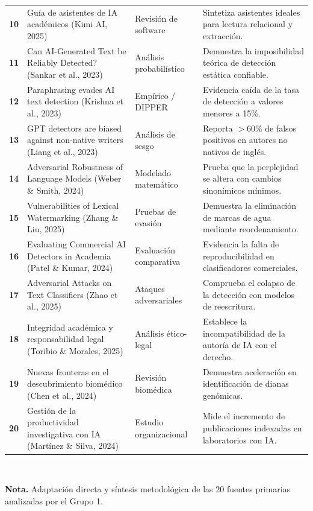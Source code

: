 \begin{table}[htpb!]
\begin{tabularx}{\textwidth}{>{\centering\arraybackslash\bfseries}p{0.6cm} >{\raggedright\arraybackslash}p{4.2cm} >{\raggedright\arraybackslash}p{2.6cm} >{\raggedright\arraybackslash}X}
    10 & Guía de asistentes de IA académicos (Kimi AI, 2025) & Revisión de software & Sintetiza asistentes ideales para lectura relacional y extracción. \\
    11 & Can AI-Generated Text be Reliably Detected? (Sankar et al., 2023) & Análisis probabilístico & Demuestra la imposibilidad teórica de detección estática confiable. \\
    12 & Paraphrasing evades AI text detection (Krishna et al., 2023) & Empírico / DIPPER & Evidencia caída de la tasa de detección a valores menores a 15\%. \\
    13 & GPT detectors are biased against non-native writers (Liang et al., 2023) & Análisis de sesgo & Reporta $>$60\% de falsos positivos en autores no nativos de inglés. \\
    14 & Adversarial Robustness of Language Models (Weber \& Smith, 2024) & Modelado matemático & Prueba que la perplejidad se altera con cambios sinonímicos mínimos. \\
    15 & Vulnerabilities of Lexical Watermarking (Zhang \& Liu, 2025) & Pruebas de evasión & Demuestra la eliminación de marcas de agua mediante reordenamiento. \\
    16 & Evaluating Commercial AI Detectors in Academia (Patel \& Kumar, 2024) & Evaluación comparativa & Evidencia la falta de reproducibilidad en clasificadores comerciales. \\
    17 & Adversarial Attacks on Text Classifiers (Zhao et al., 2025) & Ataques adversariales & Comprueba el colapso de la detección con modelos de reescritura. \\
    18 & Integridad académica y responsabilidad legal (Toribio \& Morales, 2025) & Análisis ético-legal & Establece la incompatibilidad de la autoría de IA con el derecho. \\
    19 & Nuevas fronteras en el descubrimiento biomédico (Chen et al., 2024) & Revisión biomédica & Demuestra aceleración en identificación de dianas genómicas. \\
    20 & Gestión de la productividad investigativa con IA (Martínez \& Silva, 2024) & Estudio organizacional & Mide el incremento de publicaciones indexadas en laboratorios con IA. \\
    \bottomrule
    \end{tabularx}\\[0.15cm]
    \raggedright
    \scriptsize \textbf{Nota.} Adaptación directa y síntesis metodológica de las 20 fuentes primarias analizadas por el Grupo 1.
\end{table}

